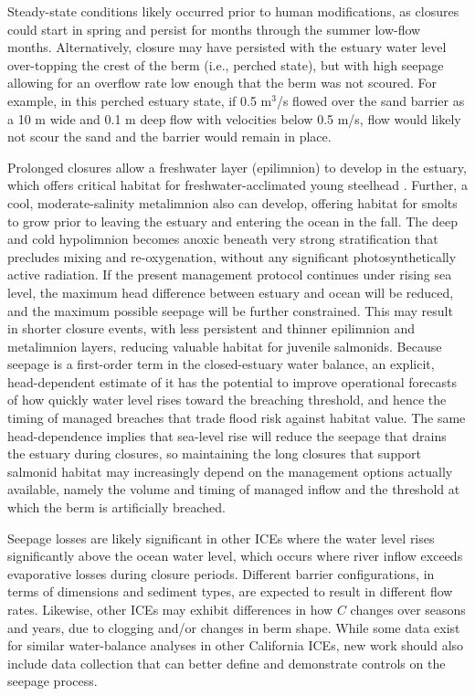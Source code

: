 \documentclass[preprint,12pt,authoryear]{elsarticle}
\begin{document}
Steady-state conditions likely occurred prior to human modifications, as closures could start in spring and persist for months through the summer low-flow months. Alternatively, closure may have persisted with the estuary water level over-topping the crest of the berm (i.e., perched state), but with high seepage allowing for an overflow rate low enough that the berm was not scoured. For example, in this perched estuary state, if 0.5 m$^3$/s flowed over the sand barrier as a 10 m wide and 0.1 m deep flow with velocities below 0.5 m/s, flow would likely  not scour the sand and the barrier would remain in place.

Prolonged closures allow a freshwater layer (epilimnion) to develop in the estuary, which offers critical habitat for freshwater-acclimated young steelhead \citep{largier20205}. Further, a cool, moderate-salinity metalimnion also can develop, offering habitat for smolts to grow prior to leaving the estuary and entering the ocean in the fall. The deep and cold hypolimnion becomes anoxic beneath very strong stratification that precludes mixing and re-oxygenation, without any significant photosynthetically active radiation. If the present management protocol continues under rising sea level, the maximum head difference between estuary and ocean will be reduced, and the maximum possible seepage will be further constrained.  This may result in shorter closure events, with less persistent and thinner epilimnion and metalimnion layers, reducing valuable habitat for juvenile salmonids. Because seepage is a first-order term in the closed-estuary water balance, an explicit, head-dependent estimate of it has the potential to improve operational forecasts of how quickly water level rises toward the breaching threshold, and hence the timing of managed breaches that trade flood risk against habitat value. The same head-dependence implies that sea-level rise will reduce the seepage that drains the estuary during closures, so maintaining the long closures that support salmonid habitat may increasingly depend on the management options actually available, namely the volume and timing of managed inflow and the threshold at which the berm is artificially breached.

 Seepage losses are likely significant in other ICEs where the water level rises significantly above the ocean water level, which occurs where river inflow exceeds evaporative losses during closure periods.  Different barrier configurations, in terms of dimensions and sediment types, are expected to result in different flow rates.  Likewise, other ICEs may exhibit differences in how $C$ changes over seasons and years, due to clogging and/or changes in berm shape. While some data exist for similar water-balance analyses in other California ICEs, new work should also include data collection that can better define and demonstrate controls on the seepage process.
\end{document}
